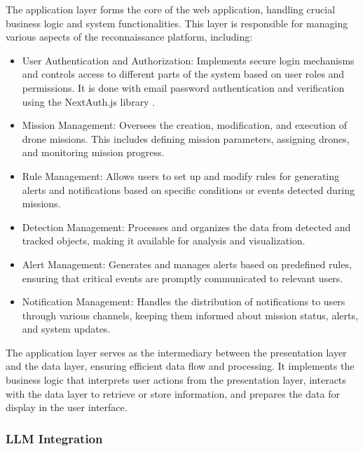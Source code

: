 The application layer forms the core of the web application, handling crucial business logic and system functionalities. This layer is responsible for managing various aspects of the reconnaissance platform, including:

\begin{itemize}
	\item User Authentication and Authorization: Implements secure login mechanisms and controls access to different parts of the system based on user roles and permissions. It is done with email password authentication and verification using the NextAuth.js library \autocite{nextauthNextAuthjsAuthentication}.

	\item Mission Management: Oversees the creation, modification, and execution of drone missions. This includes defining mission parameters, assigning drones, and monitoring mission progress.

	\item Rule Management: Allows users to set up and modify rules for generating alerts and notifications based on specific conditions or events detected during missions.

	\item Detection Management: Processes and organizes the data from detected and tracked objects, making it available for analysis and visualization.

	\item Alert Management: Generates and manages alerts based on predefined rules, ensuring that critical events are promptly communicated to relevant users.

	\item Notification Management: Handles the distribution of notifications to users through various channels, keeping them informed about mission status, alerts, and system updates.
\end{itemize}

The application layer serves as the intermediary between the presentation layer and the data layer, ensuring efficient data flow and processing. It implements the business logic that interprets user actions from the presentation layer, interacts with the data layer to retrieve or store information, and prepares the data for display in the user interface.

\subsubsection{LLM Integration}\label{subsubsec:implementation_llm_integration}

